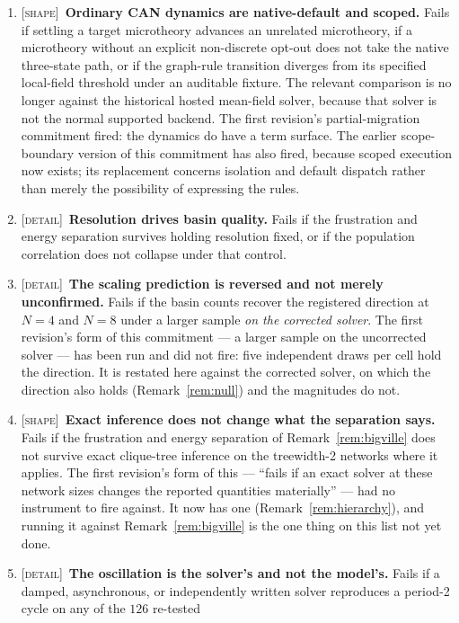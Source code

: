 \documentclass[11pt,a4paper]{article}
\theoremstyle{remark}
\begin{document}
\begin{enumerate}[leftmargin=*]
\item \textsc{[shape]}~\textbf{Ordinary CAN dynamics are native-default and scoped.} Fails if
settling a target microtheory advances an unrelated microtheory, if a microtheory without an explicit
non-discrete opt-out does not take the native three-state path, or if the graph-rule transition diverges
from its specified local-field threshold under an auditable fixture. The relevant comparison is no
longer against the historical hosted mean-field solver, because that solver is not the normal supported
backend. The first revision's partial-migration commitment fired: the dynamics do have a term surface.
The earlier scope-boundary version of this commitment has also fired, because scoped execution now
exists; its replacement concerns isolation and default dispatch rather than merely the possibility of
expressing the rules.
\item \textsc{[detail]}~\textbf{Resolution drives basin quality.} Fails if the frustration and energy
separation survives holding resolution fixed, or if the population correlation does not collapse under
that control.
\item \textsc{[detail]}~\textbf{The scaling prediction is reversed and not merely unconfirmed.} Fails
if the basin counts recover the registered direction at $N=4$ and $N=8$ under a larger sample
\emph{on the corrected solver}. The first revision's form of this commitment --- a larger sample on the
uncorrected solver --- has been run and did not fire: five independent draws per cell hold the
direction. It is restated here against the corrected solver, on which the direction also holds
(Remark~\ref{rem:null}) and the magnitudes do not.
\item \textsc{[shape]}~\textbf{Exact inference does not change what the separation says.} Fails if the
frustration and energy separation of Remark~\ref{rem:bigville} does not survive exact clique-tree
inference on the treewidth-2 networks where it applies. The first revision's form of this ---
``fails if an exact solver at these network sizes changes the reported quantities materially'' --- had
no instrument to fire against. It now has one (Remark~\ref{rem:hierarchy}), and running it against
Remark~\ref{rem:bigville} is the one thing on this list not yet done.
\item \textsc{[detail]}~\textbf{The oscillation is the solver's and not the model's.} Fails if a damped,
asynchronous, or independently written solver reproduces a period-2 cycle on any of the $126$ re-tested

\end{enumerate}
\end{document}
